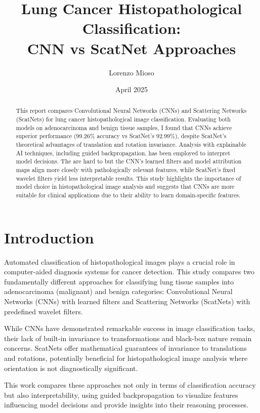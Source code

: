 \documentclass[10pt,twocolumn]{article}
\title{Lung Cancer Histopathological Classification: \\CNN vs ScatNet Approaches}
\author{Lorenzo Mioso}
\date{April 2025}
\begin{document}
\maketitle

\begin{abstract}
This report compares Convolutional Neural Networks (CNNs) and Scattering Networks (ScatNets) for lung cancer histopathological image classification. Evaluating both models on adenocarcinoma and benign tissue samples, I found that CNNs achieve superior performance (99.26\% accuracy vs ScatNet's 92.99\%), despite ScatNet's theoretical advantages of translation and rotation invariance. Analysis with explainable AI techniques, including guided backpropagation, has been employed to interpret model decisions. The are hard to but the CNN's learned filters and model attribution maps align more closely with pathologically relevant features, while ScatNet's fixed wavelet filters yield less interpretable results. This study highlights the importance of model choice in histopathological image analysis and suggests that CNNs are more suitable for clinical applications due to their ability to learn domain-specific features.
\end{abstract}

\section{Introduction}
Automated classification of histopathological images plays a crucial role in computer-aided diagnosis systems for cancer detection. This study compares two fundamentally different approaches for classifying lung tissue samples into adenocarcinoma (malignant) and benign categories: Convolutional Neural Networks (CNNs) with learned filters and Scattering Networks (ScatNets) with predefined wavelet filters.

While CNNs have demonstrated remarkable success in image classification tasks, their lack of built-in invariance to transformations and black-box nature remain concerns. ScatNets offer mathematical guarantees of invariance to translations and rotations, potentially beneficial for histopathological image analysis where orientation is not diagnostically significant.

This work compares these approaches not only in terms of classification accuracy but also interpretability, using guided backpropagation to visualize features influencing model decisions and provide insights into their reasoning processes.
\end{document}
